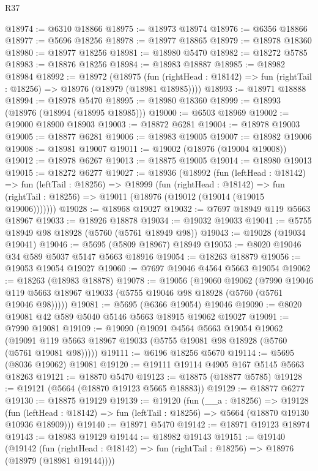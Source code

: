 \begin{lexlean}{R37}
\begin{coremodule}
@18974 := @6310 @18866
@18975 := @18973 @18974
@18976 := @6356 @18866
@18977 := @5696 @18256
@18978 := @18977 @18865
@18979 := @18978 @18360
@18980 := @18977 @18256
@18981 := @18980 @5470
@18982 := @18272 @5785
@18983 := @18876 @18256
@18984 := @18983 @18887
@18985 := @18982 @18984
@18992 := @18972
    (@18975
      (fun (rightHead : @18142) => fun (rightTail : @18256) => @18976 (@18979 (@18981 @18985))))
@18993 := @18971 @18888
@18994 := @18978 @5470
@18995 := @18980 @18360
@18999 := @18993 (@18976 (@18994 (@18995 @18985)))
@19000 := @6503 @18969
@19002 := @19000 @18900 @18903
@19003 := @18872 @6281
@19004 := @18978 @19003
@19005 := @18877 @6281
@19006 := @18983 @19005
@19007 := @18982 @19006
@19008 := @18981 @19007
@19011 := @19002 (@18976 (@19004 @19008))
@19012 := @18978 @6267
@19013 := @18875 @19005
@19014 := @18980 @19013
@19015 := @18272 @6277
@19027 := @18936
    (@18992
      (fun (leftHead : @18142) =>
      fun (leftTail : @18256) =>
      @18999
        (fun (rightHead : @18142) =>
        fun (rightTail : @18256) => @19011 (@18976 (@19012 (@19014 (@19015 @19006)))))))
@19028 := @18968 @19027
@19032 := @7697 @18949 @119 @5663 @18967
@19033 := @18926 @18878
@19034 := @19032 @19033
@19041 := @5755 @18949 @98 @18928 (@5760 (@5761 @18949 @98))
@19043 := @19028 (@19034 @19041)
@19046 := @5695 (@5809 @18967) @18949
@19053 := @8020 @19046 @34 @589 @5037 @5147 @5663 @18916
@19054 := @18263 @18879
@19056 := @19053 @19054 @19027
@19060 := @7697 @19046 @4564 @5663 @19054
@19062 := @18263 (@18983 @18878)
@19078 := @19056
    (@19060
      @19062
      (@7990 @19046 @119 @5663 @18967 @19033 (@5755 @19046 @98 @18928 (@5760 (@5761 @19046 @98)))))
@19081 := @5695 (@6366 @19054) @19046
@19090 := @8020 @19081 @42 @589 @5040 @5146 @5663 @18915 @19062 @19027
@19091 := @7990 @19081
@19109 := @19090
    (@19091
      @4564
      @5663
      @19054
      @19062
      (@19091 @119 @5663 @18967 @19033 (@5755 @19081 @98 @18928 (@5760 (@5761 @19081 @98)))))
@19111 := @6196 @18256 @5670
@19114 := @5695 (@8036 @19062) @19081
@19120 := @19111 @19114 @4905 @167 @5145 @5663 @18263
@19121 := @18870 @5470
@19123 := @18875 (@18877 @5785)
@19128 := @19121 (@5664 (@18870 @19123 @5665 @18883))
@19129 := @18877 @6277
@19130 := @18875 @19129
@19139 := @19120
    (fun (__a : @18256) =>
    @19128
      (fun (leftHead : @18142) => fun (leftTail : @18256) => @5664 (@18870 @19130 @10936 @18909)))
@19140 := @18971 @5470
@19142 := @18971 @19123 @18974
@19143 := @18983 @19129
@19144 := @18982 @19143
@19151 := @19140
    (@19142
      (fun (rightHead : @18142) => fun (rightTail : @18256) => @18976 (@18979 (@18981 @19144))))

\end{coremodule}
\end{lexlean}
